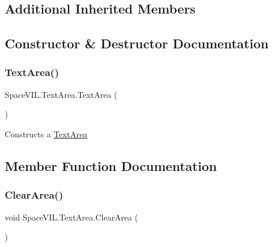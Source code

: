 \subsection*{Additional Inherited Members}


\subsection{Constructor \& Destructor Documentation}
\mbox{\label{class_space_v_i_l_1_1_text_area_a1450947f3404821d0242263470641c75}} 
\subsubsection{\texorpdfstring{Text\+Area()}{TextArea()}}
{\footnotesize\ttfamily Space\+V\+I\+L.\+Text\+Area.\+Text\+Area (\begin{DoxyParamCaption}{ }\end{DoxyParamCaption})\hspace{0.3cm}{\ttfamily [inline]}}



Constructs a \mbox{\hyperlink{class_space_v_i_l_1_1_text_area}{Text\+Area}} 



\subsection{Member Function Documentation}
\mbox{\label{class_space_v_i_l_1_1_text_area_a698e7fe3b617f824c8e10a11c81a9a51}} 
\subsubsection{\texorpdfstring{Clear\+Area()}{ClearArea()}}
{\footnotesize\ttfamily void Space\+V\+I\+L.\+Text\+Area.\+Clear\+Area (\begin{DoxyParamCaption}{ }\end{DoxyParamCaption})\hspace{0.3cm}{\ttfamily [inline]}}



